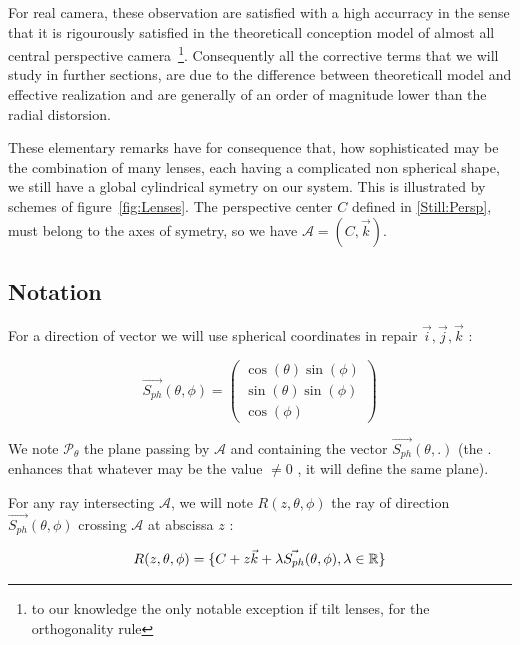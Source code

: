 For real camera, these observation are satisfied with a high accurracy in the sense that it is
rigourously satisfied in the theoreticall conception model of almost all central perspective
camera~\footnote{to our knowledge the only notable exception if tilt lenses, for the orthogonality rule}.
Consequently all the corrective terms that we will study in further sections,
are due to the difference between theoreticall model and effective realization and are
generally of an order of magnitude lower than the radial distorsion.

These elementary remarks have for consequence that, how sophisticated may be the combination
of many lenses, each having a complicated non spherical shape, we still have a global cylindrical
symetry on our system. This is illustrated by schemes of figure~\ref{fig:Lenses}.
The perspective center $C$ defined in \ref{Still:Persp}, must belong to the axes of symetry,
so we have $\mathcal{A}=(C,\vec{k})$. 


\subsection{Notation}

For a direction of vector we will use spherical coordinates in repair $\vec{i},\vec{j},\vec{k}$ :

\begin{equation}
	\vec{S_{ph}}(\theta,\phi)   =\begin{pmatrix}  \cos(\theta) \sin(\phi) \\ \sin(\theta) \sin(\phi)  \\ \cos(\phi) \end{pmatrix}
	     \label{PC:Spher:Coord}
\end{equation}

We  note $\mathcal{P}_{\theta}$  the plane passing by $\mathcal{A}$ and containing the vector    $\vec{S_{ph}}(\theta,.)$
(the $.$ enhances that whatever may be the value $\neq 0$ , it will define the same plane).

For any ray intersecting $\mathcal{A}$, we will note $R(z,\theta,\phi)$ the ray of direction $\vec{S_{ph}}(\theta,\phi)$  crossing $\mathcal{A}$
at abscissa $z$  :

\begin{equation}
	R(z,\theta,\phi) = \{C+ z \vec{k} + \lambda \vec{S_{ph}}(\theta,\phi), \lambda \in \mathbb{R}\}
	     \label{PC:RayParam}
\end{equation}


